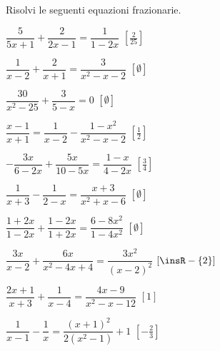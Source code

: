 \begin{esercizio}[\Ast]
\label{ese:20.21}
Risolvi le seguenti equazioni frazionarie.
\begin{multicols}{2}
\begin{enumeratea}
 \item $\dfrac{5}{5x+1}+\dfrac{2}{2x-1}=\dfrac{1}{1-2x}$
  \hfill $\left[\frac{2}{25}\right]$
 \item $\dfrac{1}{x-2}+\dfrac{2}{x+1}=\dfrac{3}{x^{2}-x-2}$
  \hfill $\left[\emptyset\right]$
 \item $\dfrac{30}{x^{2}-25}+\dfrac{3}{5-x}=0$
  \hfill $\left[\emptyset\right]$
 \item $\dfrac{x-1}{x+1}=\dfrac{1}{x-2}-\dfrac{1-x^{2}}{x^{2}-x-2}$
  \hfill $\left[\frac{1}{2}\right]$
 \item $-{\dfrac{3x}{6-2x}}+\dfrac{5x}{10-5x}=\dfrac{1-x}{4-2x}$
  \hfill $\left[\frac{3}{4}\right]$
 \item $\dfrac{1}{x+3}-\dfrac{1}{2-x}=\dfrac{x+3}{x^{2}+x-6}$
  \hfill $\left[\emptyset\right]$
 \item $\dfrac{1+2x}{1-2x}+\dfrac{1-2x}{1+2x}=\dfrac{6-8x^{2}}{1-4x^{2}}$
  \hfill $\left[\emptyset\right]$
 \item $\dfrac{3x}{x-2}+\dfrac{6x}{x^{2}-4x+4}=\dfrac{3x^{2}}{(x-2)^{2}}$
  \hfill $\left[\insR-\{2\}\right]$
 \item $\dfrac{2x+1}{x+3}+\dfrac{1}{x-4}=\dfrac{4x-9}{x^{2}-x-12}$
  \hfill $\left[1\right]$
 \item $\dfrac{1}{x-1}-\dfrac{1}{x}=\dfrac{(x+1)^{2}}{2(x^{2}-1)}+1$
  \hfill $\left[-{\frac{2}{3}}\right]$
\end{enumeratea}
\end{multicols}
\end{esercizio}

